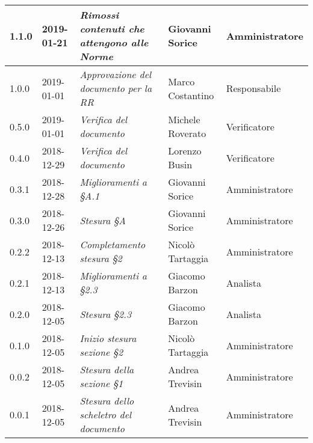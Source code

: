 \begin{longtable}{C{2cm}|C{2.5cm}|C{4.5cm}|C{2.5cm}|C{3cm}}
		1.1.0 & 2019-01-21 & \emph{Rimossi contenuti che attengono alle Norme} & Giovanni Sorice & Amministratore \\
		\hline
		
		1.0.0 & 2019-01-01 & \emph{Approvazione del documento per la RR} & Marco Costantino & Responsabile \\
		\hline
		
		0.5.0 & 2019-01-01 & \emph{Verifica del documento} & Michele Roverato & Verificatore \\
		\hline
		
		0.4.0 & 2018-12-29 & \emph{Verifica del documento} & Lorenzo Busin & Verificatore \\
		\hline
		
		0.3.1 & 2018-12-28 & \emph{Miglioramenti a §A.1} & Giovanni Sorice & Amministratore \\
		\hline
		
		0.3.0 & 2018-12-26 & \emph{Stesura §A} & Giovanni Sorice & Amministratore \\
		\hline
		
		0.2.2 & 2018-12-13 & \emph{Completamento stesura §2} & Nicolò Tartaggia & Amministratore \\
		\hline
		
		0.2.1 & 2018-12-13 & \emph{Miglioramenti a §2.3} & Giacomo Barzon & Analista \\
		\hline
		
		0.2.0 & 2018-12-05 & \emph{Stesura §2.3} & Giacomo Barzon & Analista \\
		\hline
		
		0.1.0 & 2018-12-05 & \emph{Inizio stesura sezione §2} & Nicolò Tartaggia & Amministratore \\
		\hline
		
		0.0.2 & 2018-12-05 & \emph{Stesura della sezione §1} & Andrea Trevisin & Amministratore \\
		\hline
		
		0.0.1 & 2018-12-05 & \emph{Stesura dello scheletro del documento} & Andrea Trevisin & Amministratore \\
		
	\end{longtable}


\clearpage